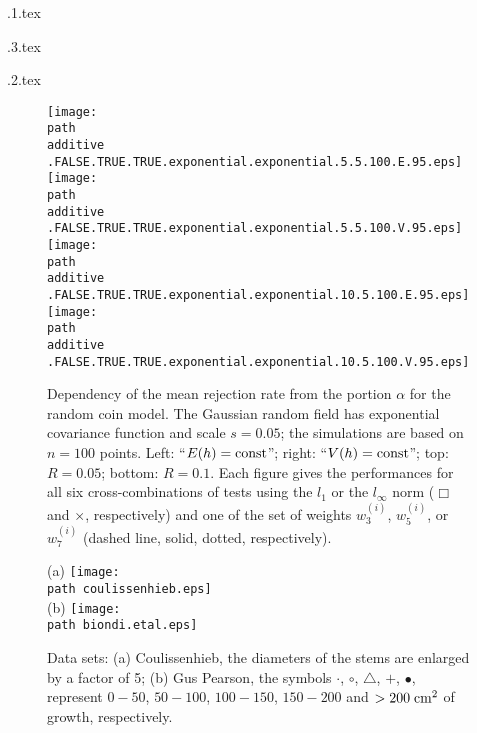 \documentclass[10pt]{article}
\def\const{\hbox{\rm const}}
\begin{document}
\begin{table}
 \texpath\additive.1.tex 
\end{table}

\begin{table}
 \texpath\variance.3.tex
\end{table}

\begin{table}
 \texpath\nn.2.tex
\end{table}


\def\FigOOO#1{
  \label{fig:#1}
   Dependency of the mean rejection rate from the portion $\alpha$
   for the random coin model.
   The Gaussian random field has
  exponential covariance function and scale $s=0.05$;
  the simulations are based on $n=100$ points.
  Left: ``$E(h)=\const$''; right: ``$V(h)=\const$'';
  top: $R=0.05$; bottom: $R=0.1$.
  Each figure gives the performances for all six cross-combinations of 
  tests using the $l_1$ or the $l_\infty$ norm ($\Box$ and $\times$,
  respectively)
  and one of the set of 
  weights $w^{(i)}_3$,   $w^{(i)}_5$, or $w^{(i)}_7$ (dashed line, solid,
  dotted, respectively).
}
 \begin{figure}
 \begin{center}
  \texttt{[image: \\path\\additive 
    .FALSE.TRUE.TRUE.exponential.exponential.5.5.100.E.95.eps]}
  \texttt{[image: \\path\\additive 
    .FALSE.TRUE.TRUE.exponential.exponential.5.5.100.V.95.eps]}\\[-0mm]
  \texttt{[image: \\path\\additive
    .FALSE.TRUE.TRUE.exponential.exponential.10.5.100.E.95.eps]} 
  \texttt{[image: \\path\\additive
    .FALSE.TRUE.TRUE.exponential.exponential.10.5.100.V.95.eps]}  
 \caption{\FigOOO{simu.E}}
 \end{center}
\end{figure}


\def\FigOOOO#1{Data sets: (a) Coulissenhieb, the diameters of the
 stems are enlarged by a factor of 5; (b) Gus Pearson,
 the symbols \raise -3pt\hbox{\huge $\cdot$}, $\circ$, 
 {\tiny$\bigtriangleup$}, $+$,
 $\bullet$, 
  represent $0-50$, $50-100$, $100-150$, $150-200$ and $>200 {\;\rm
 cm}^2$ of growth, respectively.\label{fig:#1}}
\begin{figure}
(a) \texttt{[image: \\path coulissenhieb.eps]}\\
(b) \texttt{[image: \\path biondi.etal.eps]}
\vspace*{2mm}

\caption{\FigOOOO{data.plot}}
\end{figure}
\end{document}
